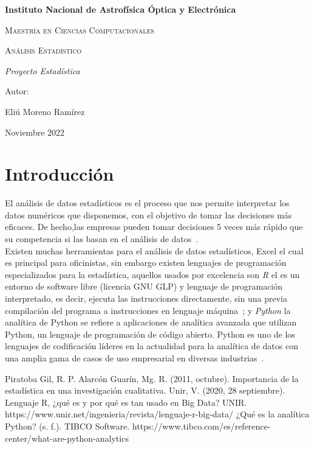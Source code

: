 \documentclass{report}
\begin{document}
%

\begin{titlepage}
\centering
{\bfseries\LARGE Instituto Nacional de Astrofísica Óptica y Electrónica \par}
\vspace{1cm}
{\scshape\Large Maestría en Ciencias Computacionales \par}
\vspace{3cm}
{\scshape\Huge Análisis Estadístico  \par}
\vspace{3cm}
{\itshape\Large Proyecto Estadística \par}
\vfill
{\Large Autor: \par}
{\Large Eliú Moreno Ramírez\par}
\vfill
{\Large Noviembre 2022 \par}
\end{titlepage}
%

%
%
%
\section{Introducción}
El análisis de datos estadísticos es el proceso que nos permite interpretar los datos numéricos que disponemos, con el objetivo de tomar las decisiones más eficaces. De hecho,las empresas pueden tomar decisiones 5 veces más rápido que su competencia si las basan en el análisis de datos~\cite{ref_article0}.\\
Existen muchas herramientas para el análisis de datos estadísticos, Excel el cual es principal para oficinistas, sin embargo existen lenguajes de programación especializados para la estadística, aquellos usados por excelencia son \textit{R} el es un entorno de software libre (licencia GNU GLP) y lenguaje de programación interpretado, es decir, ejecuta las instrucciones directamente, sin una previa compilación del programa a instrucciones en lenguaje máquina~\cite{ref_article1}; y \textit{Python} la analítica de Python se refiere a aplicaciones de analítica avanzada que utilizan Python, un lenguaje de programación de código abierto. Python es uno de los lenguajes de codificación líderes en la actualidad para la analítica de datos con una amplia gama de casos de uso empresarial en diversas industrias~\cite{ref_article2}.


\begin{thebibliography}{8}
 Piratoba Gil, R. P. Alarcón Guarín, Mg. R. (2011, octubre). Importancia de la estadística en una investigación cualitativa.
Unir, V. (2020, 28 septiembre). Lenguaje R, ¿qué es y por qué es tan usado en Big Data? UNIR. https://www.unir.net/ingenieria/revista/lenguaje-r-big-data/
¿Qué es la analítica Python? (s. f.). TIBCO Software. https://www.tibco.com/es/reference-center/what-are-python-analytics
\end{thebibliography}
\end{document}
